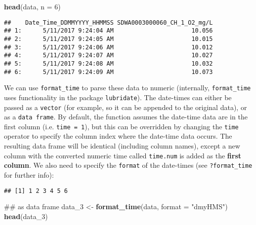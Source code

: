 \documentclass[]{book}
\newenvironment{Shaded}{\begin{snugshade}}{\end{snugshade}}
\newcommand{\KeywordTok}[1]{\textcolor[rgb]{0.13,0.29,0.53}{\textbf{#1}}}
\newcommand{\DataTypeTok}[1]{\textcolor[rgb]{0.13,0.29,0.53}{#1}}
\newcommand{\DecValTok}[1]{\textcolor[rgb]{0.00,0.00,0.81}{#1}}
\newcommand{\StringTok}[1]{\textcolor[rgb]{0.31,0.60,0.02}{#1}}
\newcommand{\OperatorTok}[1]{\textcolor[rgb]{0.81,0.36,0.00}{\textbf{#1}}}
\newcommand{\NormalTok}[1]{#1}
\begin{document}
\begin{Shaded}
\begin{Highlighting}[]
\KeywordTok{head}\NormalTok{(data, }\DataTypeTok{n =} \DecValTok{6}\NormalTok{)}
\end{Highlighting}
\end{Shaded}

\begin{verbatim}
##    Date_Time_DDMMYYYY_HHMMSS SDWA0003000060_CH_1_O2_mg/L
## 1:      5/11/2017 9:24:04 AM                      10.056
## 2:      5/11/2017 9:24:05 AM                      10.015
## 3:      5/11/2017 9:24:06 AM                      10.012
## 4:      5/11/2017 9:24:07 AM                      10.027
## 5:      5/11/2017 9:24:08 AM                      10.032
## 6:      5/11/2017 9:24:09 AM                      10.073
\end{verbatim}

We can use \texttt{format\_time} to parse these data to numeric
(internally, \texttt{format\_time} uses functionality in the package
\texttt{lubridate}). The date-times can either be passed as a
\texttt{vector} (for example, so it can be appended to the original
data), or as a \texttt{data\ frame}. By default, the function assumes
the date-time data are in the first column (i.e. \texttt{time\ =\ 1}),
but this can be overridden by changing the \texttt{time} operator to
specify the column index where the date-time data occurs. The resulting
data frame will be identical (including column names), except a new
column with the converted numeric time called \texttt{time.num} is added
as the \textbf{first column}. We also need to specify the
\texttt{format} of the date-times (see \texttt{?format\_time} for
further info):

\begin{Shaded}
\end{Shaded}

\begin{verbatim}
## [1] 1 2 3 4 5 6
\end{verbatim}

\begin{Shaded}
\begin{Highlighting}[]
\NormalTok{## as data frame}
\NormalTok{data_}\DecValTok{3}\NormalTok{ <-}\StringTok{ }\KeywordTok{format_time}\NormalTok{(data, }\DataTypeTok{format =} \StringTok{"dmyHMS"}\NormalTok{)}
\KeywordTok{head}\NormalTok{(data_}\DecValTok{3}\NormalTok{)}
\end{Highlighting}
\end{Shaded}
\end{document}
